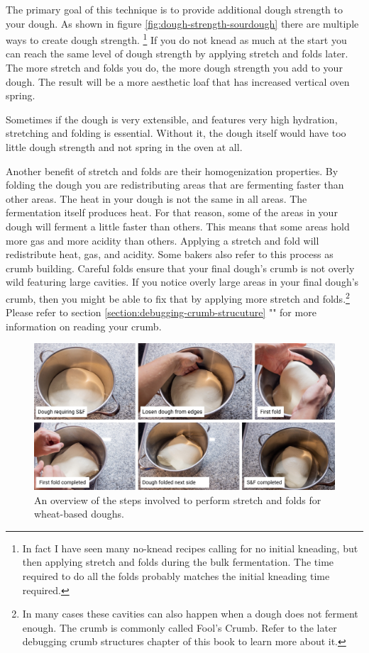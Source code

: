The primary goal of this technique is to provide
additional dough strength to your dough. As shown in figure \ref{fig:dough-strength-sourdough}
there are multiple ways to create dough strength. \footnote{In fact I have seen many no-knead
recipes calling for no initial kneading, but then applying stretch and folds
during the bulk fermentation. The time required to do all the folds probably
matches the initial kneading time required.} If you do not knead as much at
the start you can reach the same level of dough strength by applying stretch
and folds later. The more stretch and folds you do, the more dough strength
you add to your dough. The result will be a more aesthetic loaf that has
increased vertical oven spring.

Sometimes if the dough is very extensible,
and features very high hydration, stretching and folding is essential.
Without it, the dough itself would have too little dough strength and not
spring in the oven at all.

Another benefit of stretch and folds are their homogenization properties. By
folding the dough you are redistributing areas that are fermenting faster
than other areas. The heat in your dough is not the same in all areas.
The fermentation itself produces heat. For that reason, some of the areas in
your dough will ferment a little faster than others. This means that some
areas hold more gas and more acidity than others. Applying a stretch and fold
will redistribute heat, gas, and acidity. Some bakers also refer to this
process as crumb building. Careful folds ensure that your final dough's crumb
is not overly wild featuring large cavities. If you notice overly
large areas in your final dough's crumb, then you might be able to fix that
by applying more stretch and folds.\footnote{In many cases these cavities can
also happen when a dough does not ferment enough. The crumb is commonly called
Fool's Crumb. Refer to the later debugging crumb structures chapter of this
book to learn more about it.} Please refer to section \ref{section:debugging-crumb-strucuture}
"" for more information on reading
your crumb.

\begin{figure}[!htb]
  \includegraphics[width=\textwidth]{stretch-and-fold-steps}
  \caption{An overview of the steps involved to perform stretch and folds
  for wheat-based doughs.}
  \label{figure:stretch-and-fold-steps}
\end{figure}

